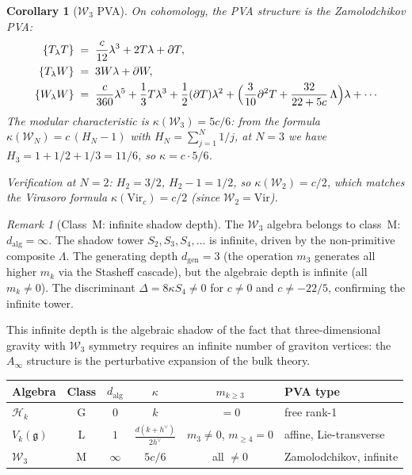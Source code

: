 \documentclass[11pt,reqno]{amsart}
\newtheorem{corollary}[theorem]{Corollary}
\theoremstyle{definition}
\theoremstyle{remark}
\newtheorem{remark}[theorem]{Remark}
\newcommand{\cH}{\mathcal{H}}
\newcommand{\cW}{\mathcal{W}}
\newcommand{\fg}{\mathfrak{g}}
\newcommand{\Ainf}{A_{\infty}}
\numberwithin{equation}{section}
\begin{document}
\begin{corollary}[$\cW_3$ PVA]
\label{cor:w3-pva}
On cohomology, the PVA structure is the Zamolodchikov PVA:
\begin{align*}
  \{T_\lambda T\}
  &\;=\;
  \frac{c}{12}\lambda^3 + 2T\lambda + \partial T, \\
  \{T_\lambda W\}
  &\;=\;
  3W\lambda + \partial W, \\
  \{W_\lambda W\}
  &\;=\;
  \frac{c}{360}\lambda^5
  + \frac{1}{3}T\lambda^3
  + \frac{1}{2}(\partial T)\lambda^2
  + \Bigl(\frac{3}{10}\partial^2 T
    + \frac{32}{22+5c}\,\Lambda\Bigr)\lambda
  + \cdots
\end{align*}
The modular characteristic is $\kappa(\cW_3) = 5c/6$: from the
formula $\kappa(\cW_N) = c\,(H_N - 1)$ with
$H_N = \sum_{j=1}^{N} 1/j$, at $N = 3$ we have
$H_3 = 1 + 1/2 + 1/3 = 11/6$, so $\kappa = c \cdot 5/6$.

Verification at $N = 2$: $H_2 = 3/2$, $H_2 - 1 = 1/2$, so
$\kappa(\cW_2) = c/2$, which matches the Virasoro formula
$\kappa(\mathrm{Vir}_c) = c/2$ (since $\cW_2 = \mathrm{Vir}$).
\end{corollary}

\begin{remark}[Class~M: infinite shadow depth]
\label{rem:w3-shadow}
The $\cW_3$ algebra belongs to class~M:
$d_{\mathrm{alg}} = \infty$.  The shadow tower
$S_2, S_3, S_4, \ldots$ is infinite, driven by the
non-primitive composite $\Lambda$.  The generating depth
$d_{\mathrm{gen}} = 3$ (the operation $m_3$ generates all higher
$m_k$ via the Stasheff cascade), but the algebraic depth is
infinite (all $m_k \neq 0$).  The discriminant
$\Delta = 8\kappa S_4 \neq 0$ for $c \neq 0$ and
$c \neq -22/5$, confirming the infinite tower.

This infinite depth is the algebraic shadow of the fact that
three-dimensional gravity with $\cW_3$ symmetry requires an
infinite number of graviton vertices: the $\Ainf$ structure is
the perturbative expansion of the bulk theory.
\end{remark}

\begin{center}
\renewcommand{\arraystretch}{1.3}
\begin{tabular}{lccccl}
  \toprule
  \textbf{Algebra} & \textbf{Class} & $d_{\mathrm{alg}}$ &
  $\kappa$ & $m_{k \geq 3}$ & \textbf{PVA type} \\
  \midrule
  $\cH_k$ & G & $0$ & $k$ & $= 0$ & free rank-1 \\
  $V_k(\fg)$ & L & $1$ & $\frac{d(k+h^\vee)}{2h^\vee}$ &
  $m_3 \neq 0$, $m_{\geq 4} = 0$ & affine, Lie-transverse \\
  $\cW_3$ & M & $\infty$ & $5c/6$ & all $\neq 0$ &
  Zamolodchikov, infinite \\
  \bottomrule
\end{tabular}
\end{center}
\end{document}
